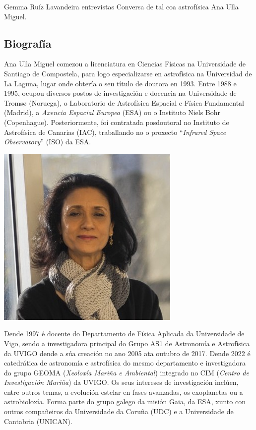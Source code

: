 \Titular*%
{Coñecendo a Ana Ulla Miguel}%
{Gemma Ruíz Lavandeira}%
{entrevistas}%
{Conversa de tal coa astrofísica Ana Ulla Miguel.}%

\begin{refsection}
\begin{multicols}{2}

\subsection*{Biografía}
Ana Ulla Miguel comezou a licenciatura en Ciencias Físicas na Universidade de
Santiago de Compostela, para logo especializarse en astrofísica na Universidad
de La Laguna, lugar onde obtería o seu título de doutora en 1993. Entre 1988 e
1995, ocupou diversos postos de investigación e docencia na Universidade de
Tromsø (Noruega), o Laboratorio de Astrofísica Espacial e Física Fundamental
(Madrid), a \textit{Axencia Espacial Europea} (ESA) ou o Instituto Niels Bohr
(Copenhague). Posteriormente, foi contratada posdoutoral no Instituto de
Astrofísica de Canarias (IAC), traballando no o proxecto ``\textit{Infrared
Space Observatory}'' (ISO) da ESA.

\begin{center}
    \includegraphics[width=0.85\linewidth]{revistas/002/imaxes/PHOTO-2025-04-30-18-18-48.jpg}
\end{center}

Dende 1997 é docente do Departamento de Física Aplicada da Universidade de
Vigo, sendo a investigadora principal do Grupo AS1 de Astronomía e Astrofísica
da UVIGO dende a súa creación no ano 2005 ata outubro de 2017. Dende 2022 é
catedrática de astronomía e astrofísica do mesmo departamento e investigadora
do grupo GEOMA (\textit{Xeoloxía Mariña e Ambiental}) integrado no CIM
(\textit{Centro de Investigación Mariña}) da UVIGO. Os seus intereses de
investigación inclúen, entre outros temas, a evolución estelar en fases
avanzadas, os exoplanetas ou a astrobioloxía. Forma parte do grupo galego da
misión Gaia, da ESA, xunto con outros compañeiros da Universidade da Coruña
(UDC) e a Universidade de Cantabria (UNICAN).


\end{multicols}
\end{refsection}
